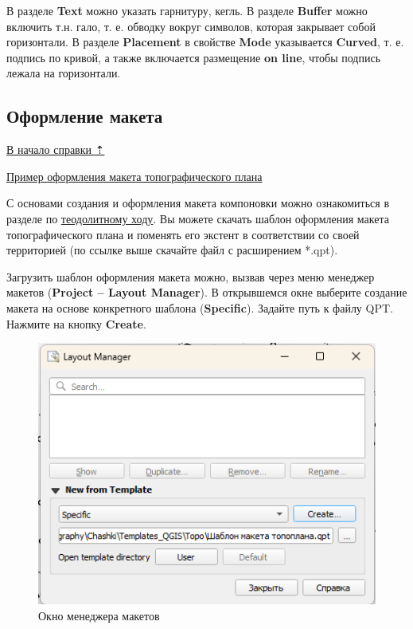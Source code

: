 \documentclass[
  12pt,
]{book}
\begin{document}
В разделе \textbf{Text} можно указать гарнитуру, кегль. В разделе \textbf{Buffer} можно включить т.н. гало, т. е. обводку вокруг символов, которая закрывает собой горизонтали. В разделе \textbf{Placement} в свойстве \textbf{Mode} указывается \textbf{Curved}, т. е. подпись по кривой, а также включается размещение \textbf{on line}, чтобы подпись лежала на горизонтали.

\subsection{Оформление макета}\label{practice-topo-layout}

\hyperref[practice-topo]{В начало справки ⇡}

\href{https://disk.yandex.ru/d/rWXOQug9ts11fQ}{Пример оформления макета топографического плана}

С основами создания и оформления макета компоновки можно ознакомиться в разделе по \hyperref[practice-theod-layout]{теодолитному ходу}. Вы можете скачать шаблон оформления макета топографического плана и поменять его экстент в соответствии со своей территорией (по ссылке выше скачайте файл с расширением *.qpt).

Загрузить шаблон оформления макета можно, вызвав через меню менеджер макетов (\textbf{Project -- Layout Manager}). В открывшемся окне выберите создание макета на основе конкретного шаблона (\textbf{Specific}). Задайте путь к файлу QPT. Нажмите на кнопку \textbf{Create}.

\begin{figure}
\centering
\includegraphics{images/Practice/Layout_Manager.png}
\caption{Окно менеджера макетов}
\end{figure}
\end{document}
